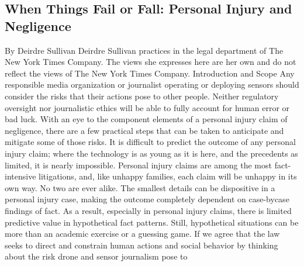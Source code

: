\begin{itemize}
\section{When Things Fail or Fall: Personal Injury and Negligence}
By Deirdre Sullivan
Deirdre Sullivan practices in the legal department of The New York Times Company. The views she
expresses here are her own and do not reflect the views of The New York Times Company.
Introduction and Scope
Any responsible media organization or journalist operating or deploying
sensors should consider the risks that their actions pose to other people.
Neither regulatory oversight nor journalistic ethics will be able to fully
account for human error or bad luck. With an eye to the component elements
of a personal injury claim of negligence, there are a few practical
steps that can be taken to anticipate and mitigate some of those risks.
It is difficult to predict the outcome of any personal injury claim; where
the technology is as young as it is here, and the precedents as limited, it is
nearly impossible. Personal injury claims are among the most fact-intensive
litigations, and, like unhappy families, each claim will be unhappy in its own
way. No two are ever alike. The smallest details can be dispositive in a personal
injury case, making the outcome completely dependent on case-bycase
findings of fact. As a result, especially in personal injury claims, there
is limited predictive value in hypothetical fact patterns. Still, hypothetical
situations can be more than an academic exercise or a guessing game. If we
agree that the law seeks to direct and constrain human actions and social
behavior by thinking about the risk drone and sensor journalism pose to


\end{itemize}
